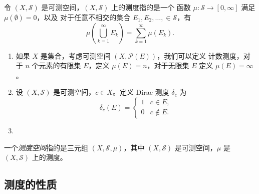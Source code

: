 \documentclass[fontset=none]{Notes}
\begin{document}
\begin{definition}
  令 $(X,\mathcal{S})$ 是可测空间，$(X,\mathcal{S})$ 上的测度指的是一个
  函数 $\mu:\mathcal{S}\to [0,\infty]$ 满足 $\mu(\emptyset)=0$，以及
  对于任意不相交的集合 $E_1,E_2,\dots,\in \mathcal{S}$，有
  \[
    \mu\left(\bigcup_{k=1}^\infty E_k\right)=\sum_{k=1}^\infty\mu(E_k).
  \]
\end{definition}

\begin{example}
  \mbox{}
  \begin{enumerate}
    \item 如果 $X$ 是集合，考虑可测空间 $(X,\mathcal{P}(E))$，我们可以定义
    计数测度，对于 $n$ 个元素的有限集 $E$，定义 $\mu(E)=n$，对于无限集 $E$
    定义 $\mu(E)=\infty$。
    \item 设 $(X,\mathcal{S})$ 是可测空间，$c\in X$。定义 Dirac 测度 $\delta_c$
    为
    \[
      \delta_c(E)=\begin{cases}
        1 & c\in E,\\
        0 & c\notin E.
      \end{cases}
    \]
    \item 
  \end{enumerate}
\end{example}

\begin{definition}
  一个\emph{测度空间}指的是三元组 $(X,\mathcal{S},\mu)$，其中 $(X,\mathcal{S})$
  是可测空间，$\mu$ 是 $(X,\mathcal{S})$ 上的测度。
\end{definition}

\subsection{测度的性质}
\end{document}

